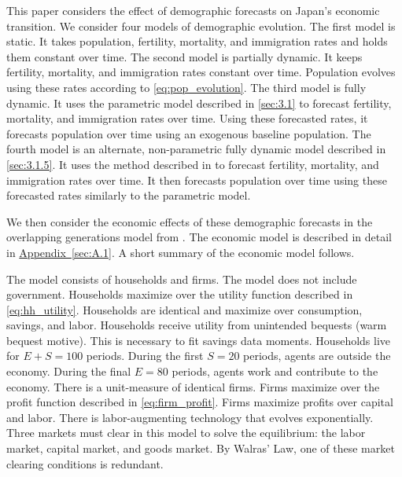 \documentclass[10pt]{article}
\renewcommand{\thesection}{\arabic{section}}
\newcommand{\aref}[1]{\hyperref[#1]{Appendix~\ref{#1}}}
\renewcommand{\section}[2][]{\oldsection[#1]{#2}\index{#1}\label{sec:\thesection}}
\numberwithin{equation}{subsection}
\begin{document}

\section{Model}

\par This paper considers the effect of demographic forecasts on Japan's economic transition. We consider four models of demographic evolution. The first model is static. It takes population, fertility, mortality, and immigration rates and holds them constant over time. The second model is partially dynamic. It keeps fertility, mortality, and immigration rates constant over time. Population evolves using these rates according to \ref{eq:pop_evolution}. The third model is fully dynamic. It uses the parametric model described in \autoref{sec:3.1} to forecast fertility, mortality, and immigration rates over time. Using these forecasted rates, it forecasts population over time using an exogenous baseline population. The fourth model is an alternate, non-parametric fully dynamic model described in \autoref{sec:3.1.5}. It uses the method described in \cite{alt_demo_paper} to forecast fertility, mortality, and immigration rates over time. It then forecasts population over time using these forecasted rates similarly to the parametric model.

\par We then consider the economic effects of these demographic forecasts in the overlapping generations model from \cite{E2020}. The economic model is described in detail in \aref{sec:A.1}. A short summary of the economic model follows.

\par The model consists of households and firms. The model does not include government. Households maximize over the utility function described in \ref{eq:hh_utility}. Households are identical and maximize over consumption, savings, and labor. Households receive utility from unintended bequests (warm bequest motive). This is necessary to fit savings data moments. Households live for \(E+S=100\) periods. During the first \(S=20\) periods, agents are outside the economy. During the final \(E=80\) periods, agents work and contribute to the economy. There is a unit-measure of identical firms. Firms maximize over the profit function described in \ref{eq:firm_profit}. Firms maximize profits over capital and labor. There is labor-augmenting technology that evolves exponentially. Three markets must clear in this model to solve the equilibrium: the labor market, capital market, and goods market. By Walras' Law, one of these market clearing conditions is redundant.
\end{document}
